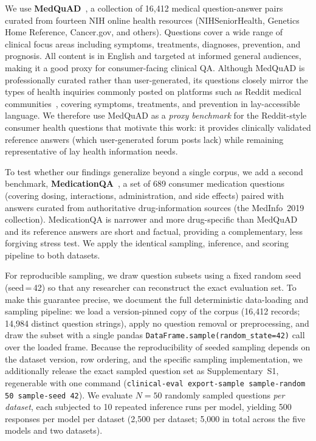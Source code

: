 \documentclass[11pt]{article}
\begin{document}
We use \textbf{MedQuAD}~\cite{abacha2019mqa}, a collection of
16,412 medical question-answer pairs curated from fourteen NIH online
health resources (NIHSeniorHealth, Genetics Home Reference, Cancer.gov,
and others).
Questions cover a wide range of clinical focus areas including symptoms,
treatments, diagnoses, prevention, and prognosis.
All content is in English and targeted at informed general audiences,
making it a good proxy for consumer-facing clinical QA.
Although MedQuAD is professionally curated rather than user-generated,
its questions closely mirror the types of health inquiries commonly
posted on platforms such as Reddit medical
communities~\cite{sager2021reddit}, covering symptoms, treatments,
and prevention in lay-accessible language. We therefore use MedQuAD as
a \emph{proxy benchmark} for the Reddit-style consumer health questions
that motivate this work: it provides clinically validated reference
answers (which user-generated forum posts lack) while remaining
representative of lay health information needs.

To test whether our findings generalize beyond a single corpus, we add
a second benchmark, \textbf{MedicationQA}~\cite{abacha2019medication}, a
set of 689 consumer medication questions (covering dosing, interactions,
administration, and side effects) paired with answers curated from
authoritative drug-information sources (the MedInfo~2019 collection).
MedicationQA is narrower and more drug-specific than MedQuAD and its
reference answers are short and factual, providing a complementary, less
forgiving stress test. We apply the identical sampling, inference, and
scoring pipeline to both datasets.

For reproducible sampling, we draw question subsets using a fixed
random seed (seed\,=\,42) so that any researcher can reconstruct the
exact evaluation set. To make this guarantee precise, we document the
full deterministic data-loading and sampling pipeline: we load a
version-pinned copy of the corpus (16{,}412 records; 14{,}984 distinct
question strings), apply no question removal or preprocessing, and draw
the subset with a single pandas \texttt{DataFrame.sample(random\_state=42)}
call over the loaded frame. Because the reproducibility of seeded
sampling depends on the dataset version, row ordering, and the specific
sampling implementation, we additionally release the exact sampled
question set as Supplementary~S1, regenerable with one command
(\texttt{clinical-eval export-sample \-\-sample-random 50 \-\-sample-seed 42}).
We evaluate $N{=}50$ randomly sampled questions \emph{per dataset}, each
subjected to 10 repeated inference runs per model, yielding 500
responses per model per dataset (2{,}500 per dataset; 5{,}000 in total
across the five models and two datasets).
\end{document}
